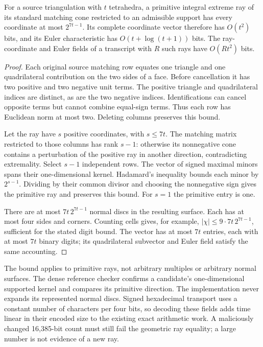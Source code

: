 \begin{proposition}
For a source triangulation with $t$ tetrahedra, a primitive integral
extreme ray of its standard matching cone restricted to an admissible
support has every coordinate at most $2^{7t-1}$. Its complete coordinate
vector therefore has $O(t^2)$ bits, and its Euler characteristic has
$O(t+\log(t+1))$ bits. The ray-coordinate and Euler fields of a transcript
with $R$ such rays have $O(Rt^2)$ bits.
\end{proposition}
\begin{proof}
Each original source matching row equates one triangle and one
quadrilateral contribution on the two sides of a face. Before cancellation
it has two positive and two negative unit terms. The positive triangle and
quadrilateral indices are distinct, as are the two negative indices.
Identifications can cancel opposite terms but cannot combine equal-sign
terms. Thus each row has Euclidean norm at most two. Deleting columns
preserves this bound.

Let the ray have $s$ positive coordinates, with $s\le7t$. The matching
matrix restricted to those columns has rank $s-1$: otherwise its
nonnegative cone contains a perturbation of the positive ray in another
direction, contradicting extremality. Select $s-1$ independent rows.
The vector of signed maximal minors spans their one-dimensional kernel.
Hadamard's inequality bounds each minor by $2^{s-1}$. Dividing by their
common divisor and choosing the nonnegative sign gives the primitive
ray and preserves this bound. For $s=1$ the primitive entry is one.

There are at most $7t\,2^{7t-1}$ normal discs in the resulting surface.
Each has at most four sides and corners. Counting cells gives, for example,
$|\chi|\le9\cdot7t\,2^{7t-1}$, sufficient for the stated digit bound.
The vector has at most $7t$ entries, each with at most $7t$ binary digits;
its quadrilateral subvector and Euler field satisfy the same accounting.
\end{proof}

The bound applies to primitive rays, not arbitrary multiples or arbitrary
normal surfaces. The dense reference checker confirms a candidate's
one-dimensional supported kernel and compares its primitive direction.
The implementation never expands its represented normal discs. Signed
hexadecimal transport uses a constant number of characters per four bits,
so decoding these fields adds time linear in their encoded size to the
existing exact arithmetic work. A maliciously changed 16,385-bit count
must still fail the geometric ray equality; a large number is not evidence
of a new ray.

